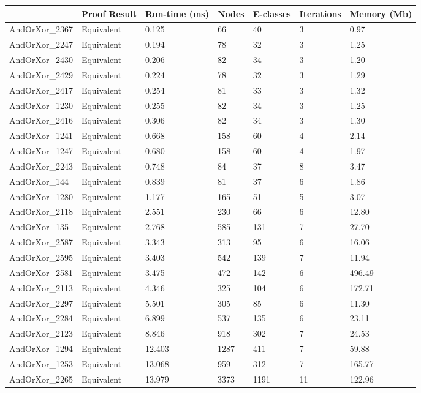 \begin{tabular}{lllllll}
\toprule
 & Proof Result & Run-time (ms) & Nodes & E-classes & Iterations & Memory (Mb) \\
\midrule
AndOrXor\_2367 & Equivalent & 0.125 & 66 & 40 & 3 & 0.97 \\
AndOrXor\_2247 & Equivalent & 0.194 & 78 & 32 & 3 & 1.25 \\
AndOrXor\_2430 & Equivalent & 0.206 & 82 & 34 & 3 & 1.20 \\
AndOrXor\_2429 & Equivalent & 0.224 & 78 & 32 & 3 & 1.29 \\
AndOrXor\_2417 & Equivalent & 0.254 & 81 & 33 & 3 & 1.32 \\
AndOrXor\_1230 & Equivalent & 0.255 & 82 & 34 & 3 & 1.25 \\
AndOrXor\_2416 & Equivalent & 0.306 & 82 & 34 & 3 & 1.30 \\
AndOrXor\_1241 & Equivalent & 0.668 & 158 & 60 & 4 & 2.14 \\
AndOrXor\_1247 & Equivalent & 0.680 & 158 & 60 & 4 & 1.97 \\
AndOrXor\_2243 & Equivalent & 0.748 & 84 & 37 & 8 & 3.47 \\
AndOrXor\_144 & Equivalent & 0.839 & 81 & 37 & 6 & 1.86 \\
AndOrXor\_1280 & Equivalent & 1.177 & 165 & 51 & 5 & 3.07 \\
AndOrXor\_2118 & Equivalent & 2.551 & 230 & 66 & 6 & 12.80 \\
AndOrXor\_135 & Equivalent & 2.768 & 585 & 131 & 7 & 27.70 \\
AndOrXor\_2587 & Equivalent & 3.343 & 313 & 95 & 6 & 16.06 \\
AndOrXor\_2595 & Equivalent & 3.403 & 542 & 139 & 7 & 11.94 \\
AndOrXor\_2581 & Equivalent & 3.475 & 472 & 142 & 6 & 496.49 \\
AndOrXor\_2113 & Equivalent & 4.346 & 325 & 104 & 6 & 172.71 \\
AndOrXor\_2297 & Equivalent & 5.501 & 305 & 85 & 6 & 11.30 \\
AndOrXor\_2284 & Equivalent & 6.899 & 537 & 135 & 6 & 23.11 \\
AndOrXor\_2123 & Equivalent & 8.846 & 918 & 302 & 7 & 24.53 \\
AndOrXor\_1294 & Equivalent & 12.403 & 1287 & 411 & 7 & 59.88 \\
AndOrXor\_1253 & Equivalent & 13.068 & 959 & 312 & 7 & 165.77 \\
AndOrXor\_2265 & Equivalent & 13.979 & 3373 & 1191 & 11 & 122.96 \\

\end{tabular}
